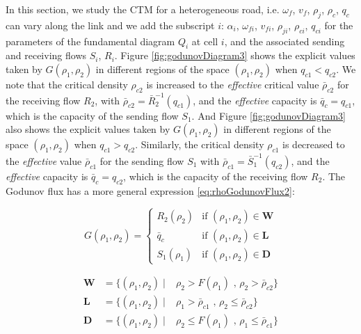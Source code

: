 In this section, we study the CTM for a heterogeneous road, i.e. $\omega_{f}$, $v_{f}$, $\rho_{j}$, $\rho_{c}$, $q_{c}$ can vary along the link and we add the subscript $i$: $\alpha_{i}$, $\omega_{fi}$, $v_{fi}$, $\rho_{ji}$, $\rho_{ci}$, $q_{ci}$ for the parameters of the fundamental diagram $Q_{i}$ at cell $i$, and the associated sending and receiving flows $S_{i}$, $R_{i}$. Figure \ref{fig:godunovDiagram3} shows the explicit values taken by $G(\rho_{1},\rho_{2})$ in different regions of the space $(\rho_{1},\rho_{2})$ when $q_{c1} < q_{c2}$. We note that the critical density $\rho_{c2}$ is increased to the \textit{effective} critical value $\bar{\rho}_{c2}$ for the receiving flow $R_{2}$, with $\bar{\rho}_{c2} = \bar{R}^{-1}_{2}(q_{c1})$, and the \textit{effective} capacity is $\bar{q}_{c} = q_{c1}$, which is the capacity of the sending flow $S_{1}$. And Figure \ref{fig:godunovDiagram3} also shows the explicit values taken by $G(\rho_{1},\rho_{2})$ in different regions of the space $(\rho_{1},\rho_{2})$ when $q_{c1} > q_{c2}$. Similarly, the critical density $\rho_{c1}$ is decreased to the \textit{effective} value $\bar{\rho}_{c1}$ for the sending flow $S_{1}$ with $\bar{\rho}_{c1} = \bar{S}^{-1}_{1}(q_{c2})$, and the \textit{effective} capacity is $\bar{q}_{c} = q_{c2}$, which is the capacity of the receiving flow $R_{2}$. The Godunov flux has a more general expression \ref{eq:rhoGodunovFlux2}:

\begin{equation}
G(\rho_{1},\rho_{2}) = \begin{cases}
R_{2}(\rho_{2}) & \text{if } (\rho_{1},\rho_{2}) \in \textbf{W}\\
\bar{q}_{c} & \text{if } (\rho_{1},\rho_{2}) \in \textbf{L}\\
S_{1}(\rho_{1}) & \text{if } (\rho_{1},\rho_{2}) \in \textbf{D}
\end{cases}
\label{eq:rhoGodunovFlux2}
\end{equation}

\begin{equation}
\begin{array}{lll}
\textbf{W} & = \{(\rho_{1},\rho_{2}) \mid & \rho_{2} > F(\rho_{1}) \text{ ,   } \rho_{2} > \bar{\rho}_{c2}\}\\
\textbf{L} & = \{(\rho_{1},\rho_{2}) \mid & \rho_{1} > \bar{\rho}_{c1} \text{ ,   } \rho_{2} \leq \bar{\rho}_{c2}\}\\
\textbf{D} & = \{(\rho_{1},\rho_{2}) \mid & \rho_{2} \leq F(\rho_{1}) \text{ ,   } \rho_{1} \leq \bar{\rho}_{c1}\}
\end{array}
\label{eq:regionsHetero}
\end{equation}

